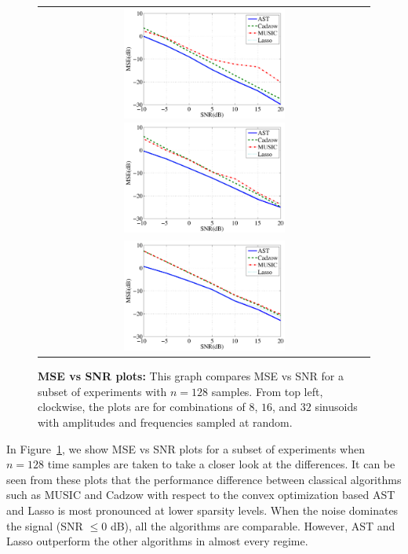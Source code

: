 \begin{figure}[htbp]
  \begin{tabular}{c}
	\includegraphics[width=0.5\textwidth]{figures/mse_snr_128_8_randamp}
	\includegraphics[width=0.5\textwidth]{figures/mse_snr_128_16_randamp} \\
	\includegraphics[width=0.5\textwidth]{figures/mse_snr_128_32_randamp}
\end{tabular}
\caption{ {\bfseries MSE vs SNR plots:} This graph compares MSE vs SNR for a subset of experiments with $n=128$ samples. From top left, clockwise, the plots are for combinations of $8$, $16$, and $32$ sinusoids with amplitudes and frequencies sampled at random.}
\label{fig:mse-snr}
\end{figure}

In Figure~\ref{fig:mse-snr}, we show MSE vs SNR plots for a subset of
experiments when $n=128$ time samples are taken to take a closer look at the
differences. It can be seen from these plots that the performance difference
between classical algorithms such as MUSIC and Cadzow with respect to the
convex optimization based AST and Lasso is most pronounced at lower sparsity
levels. When the noise dominates the signal (SNR $\leq 0$ dB), all the
algorithms are comparable. However, AST and Lasso outperform the other
algorithms in almost every regime.


